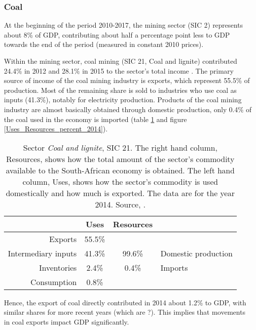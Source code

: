\documentclass[12pt,english]{article}
\begin{document}
\subsubsection{Coal}
At the beginning of the period 2010-2017, the mining sector (SIC 2) represents about 8\% of GDP, contributing about half a percentage point less to GDP towards the end of the period \citep{P0441StatSA2018Q2} (measured in constant 2010 prices). 

Within the mining sector, coal mining (SIC 21, Coal and lignite) contributed 24.4\% in 2012 and 28.1\% in 2015 to the sector's total income \citep{mining2015}. The primary source of income of the coal mining industry is exports, which represent 55.5\% of production. Most of the remaining share is sold to industries who use coal as inputs (41.3\%), notably for electricity production. Products of the coal mining industry are almost basically obtained through domestic production, only 0.4\% of the coal used in the economy is imported (table \ref{Mining2104_UR} and figure \ref{Uses_Resources_percent_2014}).

\begin{table}[!h]
	\centering
	\begin{tabular}{rc|cl}
		\hline
		& Uses & Resources  \\ 
		\hline
		Exports & 55.5\% & &\\ 
		Intermediary inputs &  41.3\%  & 99.6\% &  Domestic production\\ 
		Inventories &  2.4\% & 0.4\% & Imports    \\ 
		Consumption & 0.8\% &  &\\ 
		\hline
	\end{tabular}
	\caption{\label{Mining2104_UR}Sector \emph{Coal and lignite}, SIC 21. The right hand column, Resources, shows how the total amount of the sector's commodity available to the South-African economy is obtained. The left hand column, Uses, shows how the sector's commodity is used domestically and how much is exported. The data are for the year 2014. Source, \cite{IOT2014}.}
\end{table} 

Hence, the export of coal directly contributed in 2014 about 1.2\% to GDP, with similar shares for more recent years (which are ?). This implies that movements in coal exports impact GDP significantly. 
\end{document}
